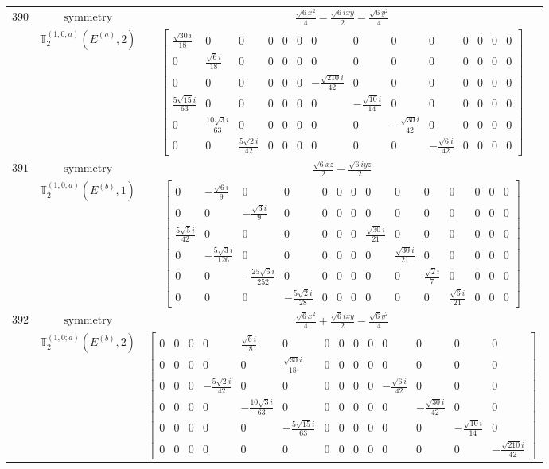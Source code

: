 \documentclass[fleqn,8pt,landscape]{jsarticle}
\begin{document}
\begin{longtable}{ccc}
$ 390 $ & $ \text{symmetry} $ & $ \frac{\sqrt{6} x^{2}}{4} - \frac{\sqrt{6} i x y}{2} - \frac{\sqrt{6} y^{2}}{4} $ \\
$  $ & $ \mathbb{T}_{2}^{(1,0;a)}(E^{(a)},2) $ & $ \begin{bmatrix} \frac{\sqrt{30} i}{18} & 0 & 0 & 0 & 0 & 0 & 0 & 0 & 0 & 0 & 0 & 0 & 0 & 0 \\ 0 & \frac{\sqrt{6} i}{18} & 0 & 0 & 0 & 0 & 0 & 0 & 0 & 0 & 0 & 0 & 0 & 0 \\ 0 & 0 & 0 & 0 & 0 & 0 & - \frac{\sqrt{210} i}{42} & 0 & 0 & 0 & 0 & 0 & 0 & 0 \\ \frac{5 \sqrt{15} i}{63} & 0 & 0 & 0 & 0 & 0 & 0 & - \frac{\sqrt{10} i}{14} & 0 & 0 & 0 & 0 & 0 & 0 \\ 0 & \frac{10 \sqrt{3} i}{63} & 0 & 0 & 0 & 0 & 0 & 0 & - \frac{\sqrt{30} i}{42} & 0 & 0 & 0 & 0 & 0 \\ 0 & 0 & \frac{5 \sqrt{2} i}{42} & 0 & 0 & 0 & 0 & 0 & 0 & - \frac{\sqrt{6} i}{42} & 0 & 0 & 0 & 0 \end{bmatrix} $ \\ \hline
$ 391 $ & $ \text{symmetry} $ & $ \frac{\sqrt{6} x z}{2} - \frac{\sqrt{6} i y z}{2} $ \\
$  $ & $ \mathbb{T}_{2}^{(1,0;a)}(E^{(b)},1) $ & $ \begin{bmatrix} 0 & - \frac{\sqrt{6} i}{9} & 0 & 0 & 0 & 0 & 0 & 0 & 0 & 0 & 0 & 0 & 0 & 0 \\ 0 & 0 & - \frac{\sqrt{3} i}{9} & 0 & 0 & 0 & 0 & 0 & 0 & 0 & 0 & 0 & 0 & 0 \\ \frac{5 \sqrt{5} i}{42} & 0 & 0 & 0 & 0 & 0 & 0 & \frac{\sqrt{30} i}{21} & 0 & 0 & 0 & 0 & 0 & 0 \\ 0 & - \frac{5 \sqrt{3} i}{126} & 0 & 0 & 0 & 0 & 0 & 0 & \frac{\sqrt{30} i}{21} & 0 & 0 & 0 & 0 & 0 \\ 0 & 0 & - \frac{25 \sqrt{6} i}{252} & 0 & 0 & 0 & 0 & 0 & 0 & \frac{\sqrt{2} i}{7} & 0 & 0 & 0 & 0 \\ 0 & 0 & 0 & - \frac{5 \sqrt{2} i}{28} & 0 & 0 & 0 & 0 & 0 & 0 & \frac{\sqrt{6} i}{21} & 0 & 0 & 0 \end{bmatrix} $ \\ \hline
$ 392 $ & $ \text{symmetry} $ & $ \frac{\sqrt{6} x^{2}}{4} + \frac{\sqrt{6} i x y}{2} - \frac{\sqrt{6} y^{2}}{4} $ \\
$  $ & $ \mathbb{T}_{2}^{(1,0;a)}(E^{(b)},2) $ & $ \begin{bmatrix} 0 & 0 & 0 & 0 & \frac{\sqrt{6} i}{18} & 0 & 0 & 0 & 0 & 0 & 0 & 0 & 0 & 0 \\ 0 & 0 & 0 & 0 & 0 & \frac{\sqrt{30} i}{18} & 0 & 0 & 0 & 0 & 0 & 0 & 0 & 0 \\ 0 & 0 & 0 & - \frac{5 \sqrt{2} i}{42} & 0 & 0 & 0 & 0 & 0 & 0 & - \frac{\sqrt{6} i}{42} & 0 & 0 & 0 \\ 0 & 0 & 0 & 0 & - \frac{10 \sqrt{3} i}{63} & 0 & 0 & 0 & 0 & 0 & 0 & - \frac{\sqrt{30} i}{42} & 0 & 0 \\ 0 & 0 & 0 & 0 & 0 & - \frac{5 \sqrt{15} i}{63} & 0 & 0 & 0 & 0 & 0 & 0 & - \frac{\sqrt{10} i}{14} & 0 \\ 0 & 0 & 0 & 0 & 0 & 0 & 0 & 0 & 0 & 0 & 0 & 0 & 0 & - \frac{\sqrt{210} i}{42} \end{bmatrix} $ \\ \hline

\end{longtable}
\end{document}
